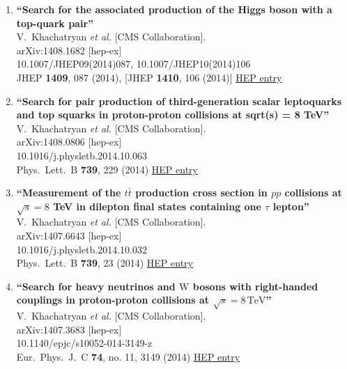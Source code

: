 \documentclass{article}
\begin{document}
\begin{enumerate}
\item%
{\bf ``Search for the associated production of the Higgs boson with a top-quark pair''}
  \\{}V.~Khachatryan {\it et al.} [CMS Collaboration].
  \\{}arXiv:1408.1682 [hep-ex]
    \\{}10.1007/JHEP09(2014)087, 10.1007/JHEP10(2014)106
\\{}JHEP {\bf 1409}, 087 (2014), [JHEP {\bf 1410}, 106 (2014)] %
\href{http://inspirehep.net/record/1310104}{HEP entry}


\item%
{\bf ``Search for pair production of third-generation scalar leptoquarks and top squarks in proton-proton collisions at sqrt(s) = 8 TeV''}
  \\{}V.~Khachatryan {\it et al.} [CMS Collaboration].
  \\{}arXiv:1408.0806 [hep-ex]
    \\{}10.1016/j.physletb.2014.10.063
\\{}Phys.\ Lett.\ B {\bf 739}, 229 (2014) %
\href{http://inspirehep.net/record/1309874}{HEP entry}


\item%
{\bf ``Measurement of the $t \bar t$ production cross section in $pp$ collisions at $\sqrt s = 8$ TeV in dilepton final states containing one $\tau$ lepton''}
  \\{}V.~Khachatryan {\it et al.} [CMS Collaboration].
  \\{}arXiv:1407.6643 [hep-ex]
    \\{}10.1016/j.physletb.2014.10.032
\\{}Phys.\ Lett.\ B {\bf 739}, 23 (2014) %
\href{http://inspirehep.net/record/1307759}{HEP entry}


\item%
{\bf ``Search for heavy neutrinos and $\mathrm {W}$ bosons with right-handed couplings in proton-proton collisions at $\sqrt{s} = 8\,\text {TeV} $''}
  \\{}V.~Khachatryan {\it et al.} [CMS Collaboration].
  \\{}arXiv:1407.3683 [hep-ex]
    \\{}10.1140/epjc/s10052-014-3149-z
\\{}Eur.\ Phys.\ J.\ C {\bf 74}, no. 11, 3149 (2014) %
\href{http://inspirehep.net/record/1306295}{HEP entry}



\end{enumerate}
\end{document}
